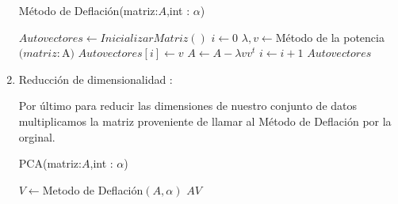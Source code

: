 \begin{enumerate}
\begin{algorithm}[H]
\caption{Método de Deflación(matriz:$A$,int : $\alpha$)}
\begin{algorithmic}[H]
    \State $Autovectores \leftarrow InicializarMatriz()$
    \State $i \leftarrow 0$
        \State $\lambda,v \leftarrow $Método de la potencia$(matriz:$A$)$
        \State $Autovectores[i] \leftarrow v$
        \State $A \leftarrow A - \lambda vv^t$
        \State $i \leftarrow i +1$
    \EndWhile  
    \State
    \Return  $Autovectores$
\end{algorithmic}
\end{algorithm}

\item Reducción de dimensionalidad :

Por último para reducir las dimensiones de nuestro conjunto de datos multiplicamos la matriz proveniente de llamar al Método de Deflación por la orginal.
\begin{algorithm}[H]
\caption{PCA(matriz:$A$,int : $\alpha$)}
\begin{algorithmic}[H]
    \State $V  \leftarrow $Metodo de Deflación$(A,\alpha)$
    \State
    \Return  $A V$
\end{algorithmic}
\end{algorithm}

\end{enumerate}





